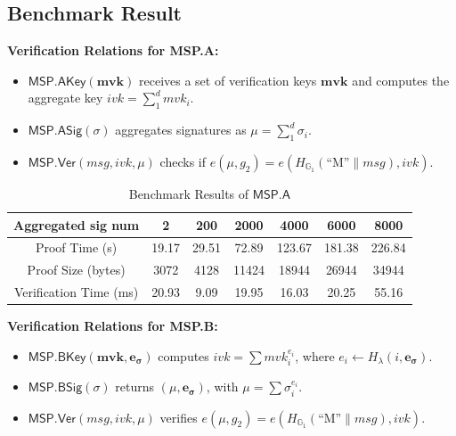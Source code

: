 \documentclass{article}
\begin{document}
\subsection{Benchmark Result}


\textbf{Verification Relations for MSP.A:}
\begin{itemize}
  \item $\mathsf{MSP.AKey}(\mathbf{mvk})$ receives a set of verification keys $\mathbf{mvk}$ and computes the aggregate key $ivk = \sum_1^d mvk_i$.
  \item $\mathsf{MSP.ASig}(\sigma)$ aggregates signatures as $\mu = \sum_1^d \sigma_i$.
  \item $\mathsf{MSP.Ver}(msg, ivk, \mu)$ checks if $e(\mu, g_2) = e(H_{\mathbb{G}_1}(\text{``M''} \| msg), ivk)$.
\end{itemize}

\begin{table}[htbp]
\centering
\caption{Benchmark Results of $\mathsf{MSP.A}$}
\renewcommand{\arraystretch}{0.9}
\setlength{\tabcolsep}{10pt}
\begin{tabular}{c|c|c|c|c|c|c} \toprule
    \textbf{Aggregated sig num} & \textbf{2} & \textbf{200} & \textbf{2000} & \textbf{4000} & \textbf{6000} & \textbf{8000}  \\ \midrule 
    Proof Time (s) & 19.17 & 29.51 & 72.89 & 123.67 & 181.38 & 226.84  \\ 
    Proof Size (bytes) & 3072 & 4128 & 11424 & 18944 & 26944 & 34944  \\ 
    Verification Time (ms) & 20.93 & 9.09 & 19.95 & 16.03 & 20.25 & 55.16 \\ \bottomrule 
\end{tabular}
\label{tab:mspa_benchamrk}
\end{table}



\textbf{Verification Relations for MSP.B:}
\begin{itemize}
  \item $\mathsf{MSP.BKey}(\mathbf{mvk}, \mathbf{e_\sigma})$ computes $ivk = \sum mvk_i^{e_i}$, where $e_i \leftarrow H_\lambda(i, \mathbf{e_\sigma})$.
  \item $\mathsf{MSP.BSig}(\sigma)$ returns $(\mu, \mathbf{e_\sigma})$, with $\mu = \sum \sigma_i^{e_i}$.
  \item $\mathsf{MSP.Ver}(msg, ivk, \mu)$ verifies $e(\mu, g_2) = e(H_{\mathbb{G}_1}(\text{``M''} \| msg), ivk)$.
\end{itemize}
\end{document}
